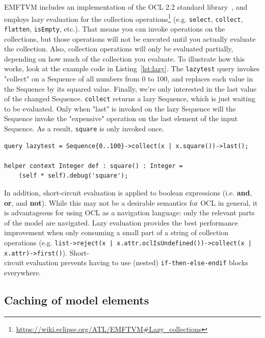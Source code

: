 \documentclass[submission,copyright,creativecommons]{eptcs}
\begin{document}
EMFTVM includes an implementation of the OCL 2.2 standard library~\cite{omg/ocl22}, and employs lazy evaluation for the collection operations\footnote{\url{https://wiki.eclipse.org/ATL/EMFTVM\#Lazy\_collections}} (e.g. \texttt{select}, \texttt{collect}, \texttt{flatten}, \texttt{isEmpty}, etc.). That means you can invoke operations on the collections, but those operations will not be executed until you actually evaluate the collection. Also, collection operations will only be evaluated partially, depending on how much of the collection you evaluate. To illustrate how this works, look at the example code in Listing~\ref{lst:lazy}. The \texttt{lazytest} query invokes "collect" on a Sequence of all numbers from 0 to 100, and replaces each value in the Sequence by its squared value. Finally, we're only interested in the last value of the changed Sequence. \texttt{collect} returns a lazy Sequence, which is just waiting to be evaluated. Only when "last" is invoked on the lazy Sequence will the Sequence invoke the "expensive" operation on the last element of the input Sequence. As a result, \texttt{square} is only invoked once.

\lstset{language=atl}
\begin{lstlisting}[float=htb, caption={Lazy collections in ATL}, label=lst:lazy, captionpos=b, frame=tb, belowskip=-10pt]
query lazytest = Sequence{0..100}->collect(x | x.square())->last();

helper context Integer def : square() : Integer =
	(self * self).debug('square');
\end{lstlisting}

In addition, short-circuit evaluation is applied to boolean expressions (i.e. \textbf{and}, \textbf{or}, and \textbf{not}). While this may not be a desirable semantics for OCL in general, it is advantageous for using OCL as a navigation language: only the relevant parts of the model are navigated. Lazy evaluation provides the best performance improvement when only consuming a small part of a string of collection operations (e.g. \texttt{list->reject(x | x.attr.oclIsUndefined())->collect(x | x.attr)->first()}). Short-\\circuit evaluation prevents having to use (nested) \texttt{if-then-else-endif} blocks everywhere.

\subsection{Caching of model elements}
\end{document}
